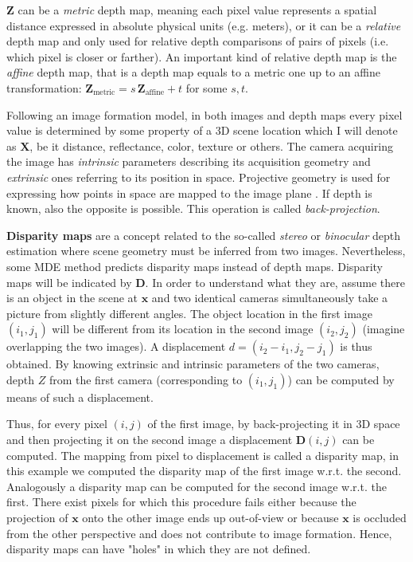 $\mathbf{Z}$ can be a \textit{metric} depth map, meaning each pixel value represents a spatial distance expressed in absolute physical units (e.g. meters), or it can be a \textit{relative} depth map and only used for relative depth comparisons of pairs of pixels (i.e. which pixel is closer or farther).
An important kind of relative depth map is the \textit{affine} depth map, that is a depth map equals to a metric one up to an affine transformation: $\mathbf{Z}_{\text{metric}} = s \, \mathbf{Z}_{\text{affine}} + t$ for some $s, t$.

Following an image formation model, in both images and depth maps every pixel value is determined by some property of a 3D scene location which I will denote as $\mathbf{X}$, be it distance, reflectance, color, texture or others.
The camera acquiring the image has \textit{intrinsic} parameters describing its acquisition geometry and \textit{extrinsic} ones referring to its position in space.
Projective geometry is used for expressing how points in space are mapped to the image plane \cite{multiview}.
If depth is known, also the opposite is possible.
This operation is called \textit{back-projection}.

\textbf{Disparity maps} are a concept related to the so-called \textit{stereo} or \textit{binocular} depth estimation where scene geometry must be inferred from two images.
Nevertheless, some MDE method predicts disparity maps instead of depth maps.
Disparity maps will be indicated by $\mathbf{D}$. In order to understand what they are, assume there is an object in the scene at $\mathbf{x}$ and two identical cameras simultaneously take a picture from slightly different angles.
The object location in the first image $(i_{1}, j_{1})$ will be different from its location in the second image $(i_{2}, j_{2})$ (imagine overlapping the two images).
A displacement $d = (i_{2} - i_{1}, j_{2} - j_{1})$ is thus obtained.
By knowing extrinsic and intrinsic parameters of the two cameras, depth $Z$ from the first camera (corresponding to $(i_{1}, j_{1})$) can be computed by means of such a displacement.

Thus, for every pixel $(i, j)$ of the first image, by back-projecting it in 3D space and then projecting it on the second image a displacement $\mathbf{D}(i,j)$ can be computed.
The mapping from pixel to displacement is called a disparity map, in this example we computed the disparity map of the first image w.r.t. the second.
Analogously a disparity map can be computed for the second image w.r.t. the first.
There exist pixels for which this procedure fails either because the projection of $\mathbf{x}$ onto the other image ends up out-of-view or because $\mathbf{x}$ is occluded from the other perspective and does not contribute to image formation.
Hence, disparity maps can have "holes" in which they are not defined.

